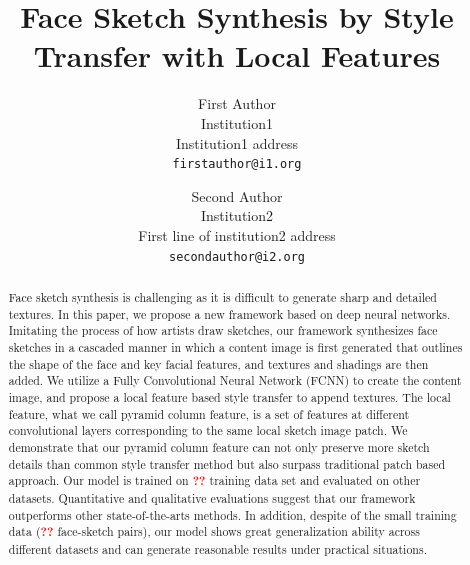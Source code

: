 \documentclass[10pt,twocolumn,letterpaper]{article}
\def\red[#1]{\textcolor{red}{\textbf{#1}}}
\begin{document}
\title{Face Sketch Synthesis by Style Transfer with Local Features}

\author{First Author\\
Institution1\\
Institution1 address\\
{\tt\small firstauthor@i1.org}
\and
Second Author\\
Institution2\\
First line of institution2 address\\
{\tt\small secondauthor@i2.org}
}

\maketitle


\begin{abstract}

Face sketch synthesis is challenging as it is difficult to generate sharp and detailed textures. In this paper, we propose a new framework based on deep neural networks. Imitating the process of how artists draw sketches, our framework synthesizes face sketches in a cascaded manner in which a content image is first generated that outlines the shape of the face and key facial features, and textures and shadings are then added. We utilize a Fully Convolutional Neural Network (FCNN) to create the content image, and propose a local feature based style transfer to append textures. The local feature, what we call pyramid column feature, is a set of features at different convolutional layers corresponding to the same local sketch image patch. We demonstrate that our pyramid column feature can not only preserve more sketch details than common style transfer method but also surpass traditional patch based approach. Our model is trained on \red[??] training data set and evaluated on other datasets. Quantitative and qualitative evaluations suggest that our framework outperforms other state-of-the-arts methods. In addition, despite of the small training data (\red[??] face-sketch pairs), our model shows great generalization ability across different datasets and can generate reasonable results under practical situations.

\end{abstract}
\end{document}
